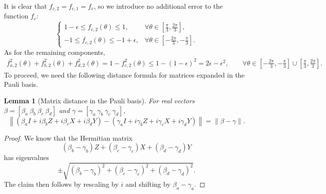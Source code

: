 \documentclass[letterpaper,onecolumn,11pt,accepted=2026-02-14]{quantumarticle}
\newcommand{\norm}[1]{\left\lVert#1\right\rVert}
\newtheorem{lemma}{Lemma}
\theoremstyle{remark}
\theoremstyle{plain}
\begin{document}
It is clear that $f_{c,2}=f_{c,1}=f_{c}$, so we introduce no additional error to the function $f_c$:
\begin{equation}
\begin{cases}
    1-\epsilon\leq f_{c,2}(\theta)\leq1,\quad &\forall \theta\in\left[\frac{\pi}{3},\frac{2\pi}{3}\right],\\
    -1\leq f_{c,2}(\theta)\leq-1+\epsilon,&\forall\theta\in\left[-\frac{2\pi}{3},-\frac{\pi}{3}\right].
\end{cases}
\end{equation}
As for the remaining components,
\begin{equation}
\begin{aligned}
    f_{a,2}^2(\theta)+f_{b,2}^2(\theta)+f_{d,2}^2(\theta)=1-f_{c,2}^2(\theta)\leq1-(1-\epsilon)^2=2\epsilon-\epsilon^2,\qquad
    \forall\theta\in\left[-\frac{2\pi}{3},-\frac{\pi}{3}\right]\cup\left[\frac{\pi}{3},\frac{2\pi}{3}\right].
\end{aligned}
\end{equation}
To proceed, we need the following distance formula for matrices expanded in the Pauli basis.
\begin{lemma}[Matrix distance in the Pauli basis]
For real vectors $\beta=\left[
    \beta_a\ \beta_b\ \beta_c\ \beta_d
\right]$ and $\gamma=\left[
    \gamma_a\ \gamma_b\ \gamma_c\ \gamma_d \right]$,
\begin{equation}
    \norm{\left(\beta_aI+i\beta_bZ+i\beta_cX+i\beta_dY\right)
    -\left(\gamma_aI+i\gamma_bZ+i\gamma_cX+i\gamma_dY\right)}
    =\norm{\beta-\gamma}.
\end{equation}
\end{lemma}
\begin{proof}
We know that the Hermitian matrix
\begin{equation}
    (\beta_b-\gamma_b)Z+(\beta_c-\gamma_c)X+(\beta_d-\gamma_d)Y
\end{equation}
has eigenvalues
\begin{equation}
    \pm\sqrt{(\beta_b-\gamma_b)^2+(\beta_c-\gamma_c)^2+(\beta_d-\gamma_d)^2}.
\end{equation}
The claim then follows by rescaling by $i$ and shifting by $\beta_a-\gamma_a$.
\end{proof}
\end{document}
